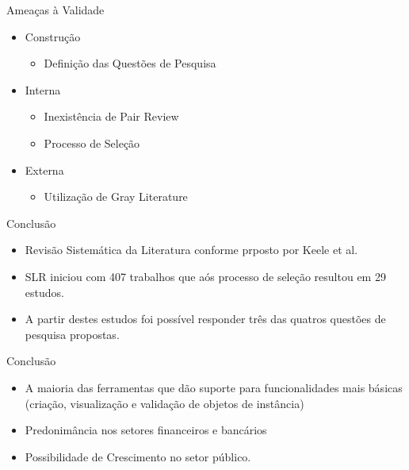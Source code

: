 \documentclass[t,14pt,mathserif]{beamer}
\begin{document}
\begin{frame}{Ameaças à Validade}
    \begin{itemize}
      \item Construção
        \begin{itemize}
        \item Definição das Questões de Pesquisa
        \end{itemize}
      \item Interna
        \begin{itemize}
        \item Inexistência de Pair Review
        \item Processo de Seleção
        \end{itemize}
      \item Externa
      \begin{itemize}
        \item Utilização de Gray Literature
        \end{itemize}
    \end{itemize}
\end{frame}
\begin{frame}{Conclusão}
    \begin{itemize}
\item Revisão Sistemática da Literatura conforme prposto por Keele et al. \cite{keele2007guidelines}
\item SLR iniciou com 407 trabalhos que aós processo de seleção resultou em 29 estudos.
\item A partir destes estudos foi possível responder três das quatros questões de pesquisa propostas.

    \end{itemize}
\end{frame}
\begin{frame}{Conclusão}
    \begin{itemize}
\item A maioria das ferramentas que dão suporte para funcionalidades mais
  básicas (criação, visualização e validação de objetos  de instância)
\item Predonimância nos setores financeiros e bancários
\item Possibilidade de Crescimento no setor público.
    \end{itemize}
\end{frame}
\end{document}
